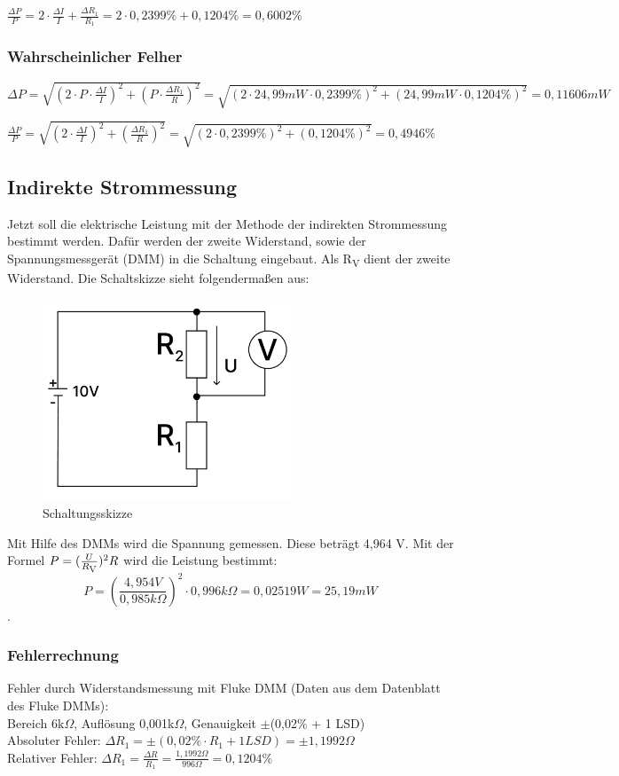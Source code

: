 $\frac{\Delta P}{P} = 2 \cdot \frac{\Delta I}{I} + \frac{\Delta R_1}{R_1} =
2 \cdot 0,2399\% + 0,1204\% = 0,6002\%$

\subsubsection{Wahrscheinlicher Felher}
$ \Delta P = \sqrt{(2 \cdot P \cdot \frac{\Delta I}{I})^2 + (P \cdot \frac{\Delta R_1}{R})^2} =
\sqrt{(2 \cdot 24,99 mW \cdot 0,2399\%)^2 + (24,99 mW \cdot 0,1204\%)^2} = 0,11606mW$

$\frac{\Delta P}{P} = \sqrt{(2 \cdot \frac{\Delta I}{I})^2 + (\frac{\Delta R_1}{R})^2} =
\sqrt{(2 \cdot 0,2399\%)^2 + (0,1204\%)^2} = 0,4946\%$



\subsection{Indirekte Strommessung}
Jetzt soll die elektrische Leistung mit der Methode der indirekten Strommessung
bestimmt werden. Dafür werden der zweite Widerstand, sowie der Spannungsmessgerät
(DMM) in die Schaltung eingebaut. Als R\textsubscript{V} dient der
zweite Widerstand. Die Schaltskizze sieht folgendermaßen aus:

\begin{figure}[H]
	\centering
	\includegraphics[height=6cm]{images/Versuch3/Versuch3_2_Schaltskizze.pdf} 
	\caption{Schaltungsskizze}
	\label{fig: Schaltungsskizze Versuch 3_2}
\end{figure}

Mit Hilfe des DMMs wird die Spannung gemessen. Diese beträgt 4,964 V. Mit der
Formel $P = (\frac{U}{R\textsubscript{V}})^{2}R$ wird die Leistung bestimmt: 
\[P = (\frac{4,954 V}{0,985 k\Omega})^{2}\cdot 0,996k\Omega = 0,02519 W = 25,19 mW\].

\subsubsection{Fehlerrechnung}
Fehler durch Widerstandsmessung mit Fluke DMM (Daten aus dem Datenblatt des Fluke DMMs):\\
Bereich 6k$\Omega$, Auflösung 0,001k$\Omega$, Genauigkeit $\pm$(0,02\% + 1 LSD)\\
Absoluter Fehler: $\Delta R_1 = \pm (0,02\% \cdot R_1 + 1 LSD) = \pm 1,1992 \Omega$\\
Relativer Fehler: $\Delta R_1 = \frac{\Delta R}{R_1} = \frac{1,1992 \Omega}{996 \Omega} = 0,1204\%$\par


